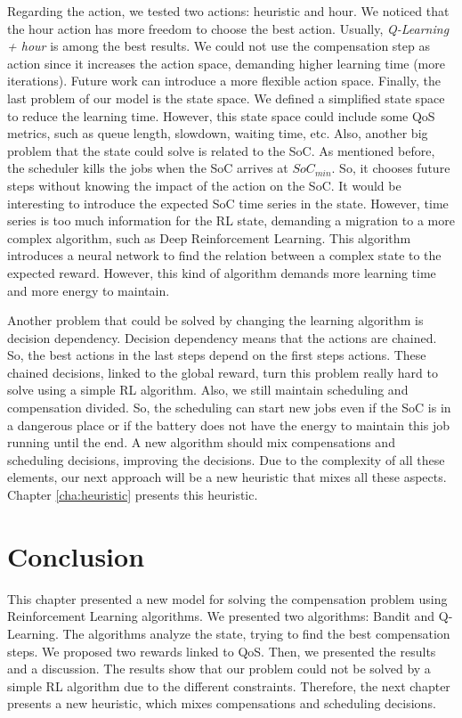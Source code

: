 Regarding the action, we tested two actions: heuristic and hour. We noticed that the hour action has more freedom to choose the best action. Usually, \emph{Q-Learning + hour} is among the best results. We could not use the compensation step as action since it increases the action space, demanding higher learning time (more iterations). Future work can introduce a more flexible action space. Finally, the last problem of our model is the state space. We defined a simplified state space to reduce the learning time. However, this state space could include some QoS metrics, such as queue length, slowdown, waiting time, etc. Also, another big problem that the state could solve is related to the SoC. As mentioned before, the scheduler kills the jobs when the SoC arrives at $SoC_{min}$. So, it chooses future steps without knowing the impact of the action on the SoC. It would be interesting to introduce the expected SoC time series in the state. However, time series is too much information for the RL state, demanding a migration to a more complex algorithm, such as Deep Reinforcement Learning. This algorithm introduces a neural network to find the relation between a complex state to the expected reward. However, this kind of algorithm demands more learning time and more energy to maintain.

Another problem that could be solved by changing the learning algorithm is decision dependency. Decision dependency means that the actions are chained. So, the best actions in the last steps depend on the first steps actions. These chained decisions, linked to the global reward, turn this problem really hard to solve using a simple RL algorithm. Also, we still maintain scheduling and compensation divided. So, the scheduling can start new jobs even if the SoC is in a dangerous place or if the battery does not have the energy to maintain this job running until the end. A new algorithm should mix compensations and scheduling decisions, improving the decisions. Due to the complexity of all these elements, our next approach will be a new heuristic that mixes all these aspects. Chapter \ref{cha:heuristic} presents this heuristic.

\section{Conclusion}
This chapter presented a new model for solving the compensation problem using Reinforcement Learning algorithms. We presented two algorithms: Bandit and Q-Learning. The algorithms analyze the state, trying to find the best compensation steps. We proposed two rewards linked to QoS. Then, we presented the results and a discussion. The results show that our problem could not be solved by a simple RL algorithm due to the different constraints. Therefore, the next chapter presents a new heuristic, which mixes compensations and scheduling decisions.